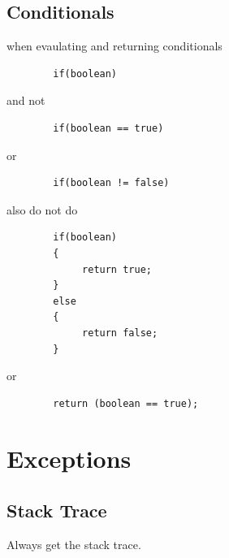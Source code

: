 \documentclass {amsart}
\begin{document}
	\subsection {Conditionals} when evaulating and returning conditionals

		\begin{verbatim}
		if(boolean)
		\end{verbatim}

		and not 
		
		\begin{verbatim}
		if(boolean == true)
		\end{verbatim} 
		
		or 
		
		\begin{verbatim}
		if(boolean != false)
		\end{verbatim}

		also do not do
		\begin{verbatim}
		if(boolean)
		{
		     return true;
		}
		else
		{
		     return false;
		}
		\end{verbatim}
		or
		\begin{verbatim}
		return (boolean == true);
		\end{verbatim}

		
\section{Exceptions}
	\subsection{Stack Trace}  Always get the stack trace.
\end{document}

